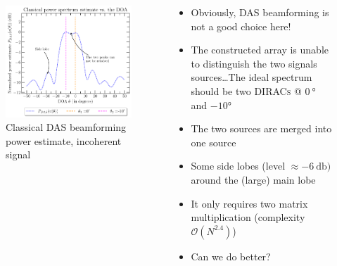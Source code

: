 \documentclass[UKenglish,8pt,aspectratio=1610]{beamer}
\begin{document}
\begin{frame}
	\begin{columns}
		\begin{column}{0.5\textwidth}
			\begin{figure}[h!]
				\centering
				\includegraphics[scale=0.4]{question2/part_A_question_2_classical_spectrum_estimate.pdf}
				\caption{Classical DAS beamforming power estimate, incoherent signal}
			\end{figure}
		\end{column}
		\begin{column}{0.5\textwidth}
		\begin{itemize}
			\item Obviously, DAS beamforming is not a good choice here! 
			\item The constructed array is unable to distinguish the two signals sources\dots The ideal spectrum should be two \textsc{DIRACs} @ $0~\si{\degree}$ and $-10\si{\degree}$
			\item The two sources are merged into one source
			\item Some side lobes (level $\approx-6~\si{\decibel)}$ around the (large) main lobe
			\item It only requires two matrix multiplication (complexity $\mathcal{O}(N^{2.4})$)
			\item Can we do better?
		\end{itemize}
		\end{column}
	\end{columns}
	\end{frame}
\end{document}
